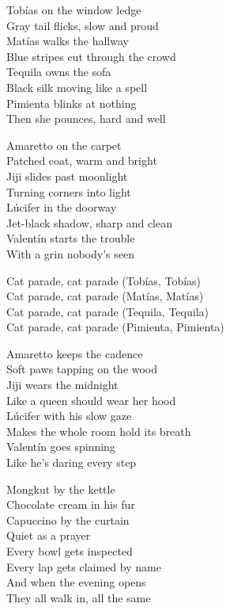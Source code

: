 \begin{lyrics}
Tobías on the window ledge\\
Gray tail flicks, slow and proud\\
Matías walks the hallway\\
Blue stripes cut through the crowd\\
Tequila owns the sofa\\
Black silk moving like a spell\\
Pimienta blinks at nothing\\
Then she pounces, hard and well

Amaretto on the carpet\\
Patched coat, warm and bright\\
Jiji slides past moonlight\\
Turning corners into light\\
Lúcifer in the doorway\\
Jet-black shadow, sharp and clean\\
Valentín starts the trouble\\
With a grin nobody’s seen

Cat parade, cat parade
(Tobías, Tobías)\\
Cat parade, cat parade
(Matías, Matías)\\
Cat parade, cat parade
(Tequila, Tequila)\\
Cat parade, cat parade
(Pimienta, Pimienta)

Amaretto keeps the cadence\\
Soft paws tapping on the wood\\
Jiji wears the midnight\\
Like a queen should wear her hood\\
Lúcifer with his slow gaze\\
Makes the whole room hold its breath\\
Valentín goes spinning\\
Like he’s daring every step

Mongkut by the kettle\\
Chocolate cream in his fur\\
Capuccino by the curtain\\
Quiet as a prayer\\
Every bowl gets inspected\\
Every lap gets claimed by name\\
And when the evening opens\\
They all walk in, all the same


\end{lyrics}
